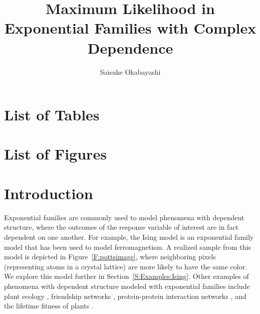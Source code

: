 \documentclass[oneside]{myumnStatThesis}
\author{Saisuke Okabayashi}
\title{Maximum Likelihood in Exponential Families with Complex Dependence}
\begin{document}
\maketitlepage %

\begin{abstract}

\end{abstract}

\tableofcontents %

\newpage
\chapter*{List of Tables}
{\def\chapter*#1{}
\listoftables}

\newpage
\chapter*{List of Figures}
{\def\chapter*#1{}
\listoffigures}


\mainmatter

\chapter{Introduction}
%
Exponential families are commonly used to model phenomena with dependent structure, 
where the outcomes of the response variable of interest are in fact dependent on one another.  For example, the Ising 
model \citep{Ising,Potts} is an exponential family model that has been used to model ferromagnetism.  A realized 
sample from this model is depicted in Figure~\ref{F:pottsimage}, where neighboring pixels (representing atoms in a crystal lattice)
are more likely to have the same color.  We explore this model further in Section~\ref{S:Examples:Ising}.
Other examples of phenomena with dependent structure modeled with exponential families include
plant ecology \citep{Besag:1974,Besag:1975}, 
friendship networks \citep{Wasserman:1996,advancesp*,Goodreau:2009}, 
protein-protein interaction networks \citep{Saul:2007},
and the lifetime fitness of plants \citep{Shaw:2008}.
  
\end{document}
